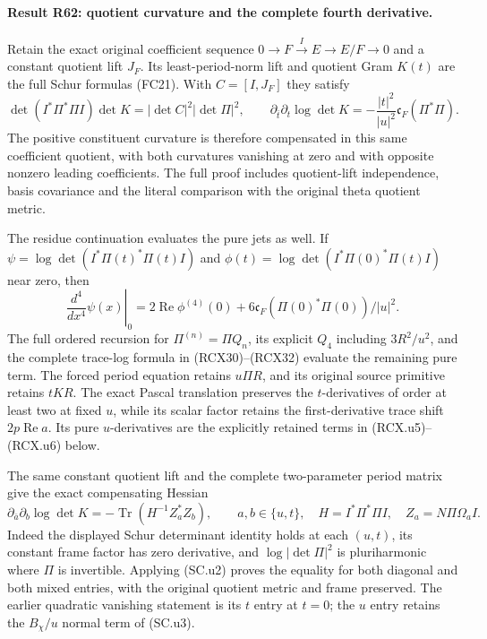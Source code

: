 \paragraph{Result R62: quotient curvature and the complete fourth derivative.}
Retain the exact original coefficient sequence
$0\to F\xrightarrow I E\to E/F\to0$ and a constant quotient lift
$J_F$. Its least-period-norm lift and quotient Gram $K(t)$ are the
full Schur formulas (FC21). With $C=[I,J_F]$ they satisfy
\[
 \det(I^*\Pi^*\Pi I)\det K
      =|\det C|^2|\det\Pi|^2,
 \qquad
 \partial_{\bar t}\partial_t\log\det K
      =-\frac{|t|^2}{|u|^2}\mathfrak c_F(\Pi^*\Pi).
\]
The positive constituent curvature is therefore compensated in this
same coefficient quotient, with both curvatures vanishing at zero
and with opposite nonzero leading coefficients. The full proof
includes quotient-lift independence, basis covariance and the
literal comparison with the original theta quotient metric.

The residue continuation evaluates the pure jets as well. If
$\psi=\log\det(I^*\Pi(t)^*\Pi(t)I)$ and
$\phi(t)=\log\det(I^*\Pi(0)^*\Pi(t)I)$ near zero, then
\[
 \left.\frac{d^4}{dx^4}\psi(x)\right|_0
   =2\operatorname{Re}\phi^{(4)}(0)
       +6\mathfrak c_F(\Pi(0)^*\Pi(0))/|u|^2.
\]
The full ordered recursion for $\Pi^{(n)}=\Pi Q_n$, its explicit
$Q_4$ including $3R^2/u^2$, and the complete trace-log formula in
(RCX30)--(RCX32) evaluate the remaining pure term. The forced
period equation retains $u\Pi R$, and its original source
primitive retains $tKR$. The exact Pascal translation preserves the \(t\)-derivatives
of order at least two at fixed \(u\), while its scalar factor
retains the first-derivative trace shift
\(2p\operatorname{Re}a\).  Its pure \(u\)-derivatives are
the explicitly retained terms in (RCX.u5)--(RCX.u6) below.



The same constant quotient lift and the complete two-parameter
period matrix give the exact compensating Hessian
\[
 \partial_{\bar a}\partial_b\log\det K
    =-\operatorname{Tr}(H^{-1}Z_a^*Z_b),\qquad
 a,b\in\{u,t\},\quad
 H=I^*\Pi^*\Pi I,\quad
 Z_a=N\Pi\Omega_a I .
\]
Indeed the displayed Schur determinant identity holds at
each \((u,t)\), its constant frame factor has zero
derivative, and \(\log|\det\Pi|^2\) is pluriharmonic
where \(\Pi\) is invertible.  Applying (SC.u2) proves
the equality for both diagonal and both mixed entries,
with the original quotient metric and frame preserved.
The earlier quadratic vanishing statement is its \(t\)
entry at \(t=0\); the \(u\) entry retains the
\(B_\chi/u\) normal term of (SC.u3).

